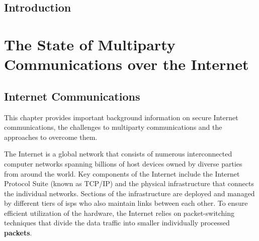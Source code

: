 \tableofcontents

\todototoc

\listoftodos

\printnoidxglossary[type=\acronymtype,title=Glossary]

\listoffigures

\mainmatter

\hypertarget{introduction}{%
\chapter{Introduction}\label{introduction}}

\hypertarget{the-state-of-multiparty-communications-over-the-internet}{%
\part{The State of Multiparty Communications over the
Internet}\label{the-state-of-multiparty-communications-over-the-internet}}


\hypertarget{sec:internet}{%
\chapter{Internet Communications}\label{sec:internet}}


This chapter provides important background information on secure
Internet communications, the challenges to multiparty communications and
the approaches to overcome them.

The Internet is a global network that consists of numerous
interconnected computer networks spanning billions of host devices owned
by diverse parties from around the world. Key components of the Internet
include the Internet Protocol Suite (known as TCP/IP) and the physical
infrastructure that connects the individual networks. Sections of the
infrastructure are deployed and managed by different tiers of
\glspl{isp} who also maintain links between each other. To ensure
efficient utilization of the hardware, the Internet relies on
packet-switching techniques that divide the data traffic into smaller
individually processed \textbf{packets}.

